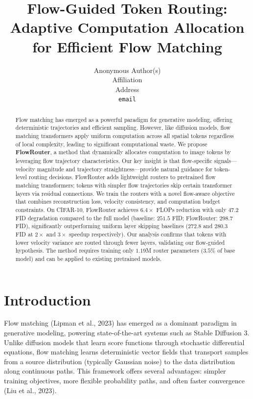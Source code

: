\documentclass{article}
\title{Flow-Guided Token Routing: Adaptive Computation Allocation for Efficient Flow Matching}
\author{%
Anonymous Author(s)\\
Affiliation\\
Address\\
\texttt{email}
}
\date{}
\begin{document}
\maketitle

\begin{abstract}
Flow matching has emerged as a powerful paradigm for generative modeling, offering deterministic trajectories and efficient sampling. However, like diffusion models, flow matching transformers apply uniform computation across all spatial tokens regardless of local complexity, leading to significant computational waste. We propose \textbf{FlowRouter}, a method that dynamically allocates computation to image tokens by leveraging flow trajectory characteristics. Our key insight is that flow-specific signals---velocity magnitude and trajectory straightness---provide natural guidance for token-level routing decisions. FlowRouter adds lightweight routers to pretrained flow matching transformers; tokens with simpler flow trajectories skip certain transformer layers via residual connections. We train the routers with a novel flow-aware objective that combines reconstruction loss, velocity consistency, and computation budget constraints. On CIFAR-10, FlowRouter achieves $6.4\times$ FLOPs reduction with only $47.2$ FID degradation compared to the full model (baseline: $251.5$ FID; FlowRouter: $298.7$ FID), significantly outperforming uniform layer skipping baselines ($272.8$ and $280.3$ FID at $2\times$ and $3\times$ speedup respectively). Our analysis confirms that tokens with lower velocity variance are routed through fewer layers, validating our flow-guided hypothesis. The method requires training only $1.19$M router parameters ($3.5\%$ of base model) and can be applied to existing pretrained models.
\end{abstract}

\section{Introduction}
\label{sec:intro}

Flow matching (Lipman et al., 2023) has emerged as a dominant paradigm in generative modeling, powering state-of-the-art systems such as Stable Diffusion 3. Unlike diffusion models that learn score functions through stochastic differential equations, flow matching learns deterministic vector fields that transport samples from a source distribution (typically Gaussian noise) to the data distribution along continuous paths. This framework offers several advantages: simpler training objectives, more flexible probability paths, and often faster convergence (Liu et al., 2023).
\end{document}
